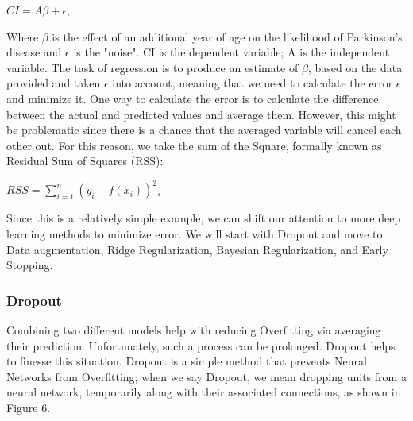 \documentclass[oneside,12pt,article]{article}
\begin{document}
 \begin{center}
$ CI = 	 A\beta + 	\epsilon $,
\end{center}
Where $\beta$ is the effect of an additional year of age on the likelihood of Parkinson's disease and $\epsilon$ is the "noise". CI is the dependent variable; A is the independent variable. The task of regression is to produce an estimate of  $\beta$, based on the data provided and taken $\epsilon$ into account, meaning that we need to calculate the error $\epsilon$ and minimize it. One way to calculate the error is to calculate the difference between the actual and predicted values and average them. However, this might be problematic since there is a chance that the averaged variable will cancel each other out. 
\newpage
For this reason, we take the sum of the Square, formally known as Residual Sum of Squares (RSS)\cite{archdeacon1994correlation}:  

 \begin{center}
$ RSS = \sum_{i=1}^{n} (y_{i}-f(x_{i}))^{2} $,
\end{center}
Since this is a relatively simple example, we can shift our attention to more deep learning methods to minimize error. We will start with Dropout and move to Data augmentation, Ridge Regularization, Bayesian Regularization, and Early Stopping. 

\subsubsection{Dropout}

Combining two different models help with reducing Overfitting via averaging their prediction. Unfortunately, such a process can be prolonged. Dropout helps to finesse this situation. Dropout is a simple method that prevents Neural Networks from Overfitting; when we say Dropout, we mean dropping units from a neural network, temporarily along with their associated connections, as shown in Figure 6.
\end{document}
